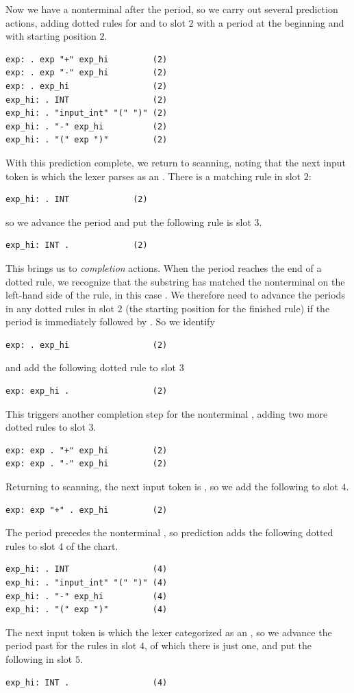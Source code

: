 \documentclass[7x10]{TimesAPriori_MIT}%
\numberwithin{theorem}{chapter}
\numberwithin{definition}{chapter}
\numberwithin{equation}{chapter}
\begin{document}
{Now we have a nonterminal after the period, so we carry out several
prediction actions, adding dotted rules for  and
 to slot $2$ with a period at the beginning and with
starting position $2$.
\begin{lstlisting}[escapechar=$]
exp: . exp "+" exp_hi         (2)
exp: . exp "-" exp_hi         (2)
exp: . exp_hi                 (2)
exp_hi: . INT                 (2)
exp_hi: . "input_int" "(" ")" (2)
exp_hi: . "-" exp_hi          (2)
exp_hi: . "(" exp ")"         (2)
\end{lstlisting}
With this prediction complete, we return to scanning, noting that the
next input token is  which the lexer parses as an
. There is a matching rule in slot $2$:
\begin{lstlisting}
exp_hi: . INT             (2)
\end{lstlisting}
so we advance the period and put the following rule is slot $3$.
\begin{lstlisting}
exp_hi: INT .             (2)
\end{lstlisting}
This brings us to \emph{completion} actions.  When the period reaches
the end of a dotted rule, we recognize that the substring
has matched the nonterminal on the left-hand side of the rule, in this case
. We therefore need to advance the periods in any dotted
rules in slot $2$ (the starting position for the finished rule) if
the period is immediately followed by . So we identify
\begin{lstlisting}
exp: . exp_hi                 (2)
\end{lstlisting}
and add the following dotted rule to slot $3$
\begin{lstlisting}
exp: exp_hi .                 (2)
\end{lstlisting}
This triggers another completion step for the nonterminal ,
adding two more dotted rules to slot $3$.
\begin{lstlisting}[escapechar=$]
exp: exp . "+" exp_hi         (2)
exp: exp . "-" exp_hi         (2)
\end{lstlisting}

Returning to scanning, the next input token is , so
we add the following to slot $4$.
\begin{lstlisting}[escapechar=$]
exp: exp "+" . exp_hi         (2)
\end{lstlisting}
The period precedes the nonterminal , so prediction adds
the following dotted rules to slot $4$ of the chart.
\begin{lstlisting}[escapechar=$]
exp_hi: . INT                 (4)
exp_hi: . "input_int" "(" ")" (4)
exp_hi: . "-" exp_hi          (4)
exp_hi: . "(" exp ")"         (4)
\end{lstlisting}
The next input token is  which the lexer categorized as an
, so we advance the period past  for the rules in
slot $4$, of which there is just one, and put the following in slot $5$.
\begin{lstlisting}[escapechar=$]
exp_hi: INT .                 (4)
\end{lstlisting}

}
\end{document}
